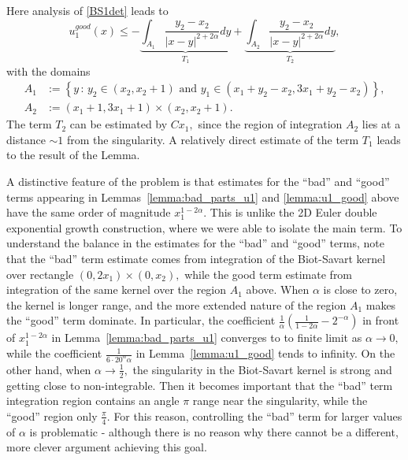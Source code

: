 \documentclass[reqno,centertags, 11pt]{amsart}
\begin{document}
Here analysis of \eqref{BS1det} leads to
\[
u_1^{good}(x) \leq -\underbrace{\int_{A_1}\frac{y_2-x_2}{|x-y|^{2+2\alpha}}  dy}_{T_1}
+ \underbrace{ \int_{A_2}\frac{y_2-x_2}{|x-y|^{2+2\alpha}}  dy}_{T_2},
\]
with the domains
\begin{equation*}
\begin{split}
A_1 &:= \left\{ y \,:\, y_2 \in \left(x_2, x_2 + 1 \right) \text{ and } y_1\in \left(x_1+y_2-x_2, 3x_1+y_2-x_2 \right) \right\},\\
A_2 &:=  \left(x_1+1, 3x_1+1\right) \times \left(x_2, x_2 + 1 \right).
\end{split}
\end{equation*}
The term $T_2$ can be estimated by $Cx_1,$ since the region of integration $A_2$ lies at a distance $\sim 1$ from the singularity.
A relatively direct estimate of the term $T_1$ leads to the result of the Lemma.

A distinctive feature of the problem is that estimates for the ``bad'' and ``good'' terms appearing in Lemmas~\ref{lemma:bad_parts_u1} and \ref{lemma:u1_good}
above have the same order of magnitude $x_1^{1-2\alpha}.$ This is unlike the 2D Euler double exponential growth construction, where we were able to isolate the main term.
To understand the balance in the estimates for the ``bad'' and ``good'' terms, note that the ``bad'' term estimate comes from integration
of the Biot-Savart kernel over rectangle $(0,2x_1) \times (0,x_2),$ while the good term estimate from integration of the same kernel over the region
$A_1$ above. When $\alpha$ is close to zero, the kernel is longer range, and the more extended nature of the region $A_1$ makes the ``good'' term dominate.
In particular, the coefficient  $\frac{1}{\alpha}\left(\frac{1}{1-2\alpha}-2^{-\alpha}\right)$ in front of $x_1^{1-2\alpha}$ in Lemma~\ref{lemma:bad_parts_u1} converges to
to finite limit as $\alpha \rightarrow 0,$ while the coefficient $\frac{1}{6\cdot 20^\alpha \alpha}$ in Lemma~\ref{lemma:u1_good} tends to infinity. On the other hand,
when $\alpha \rightarrow \frac12,$
the singularity in the Biot-Savart kernel is strong and getting close to non-integrable. Then it becomes important that the ``bad'' term integration region
contains an angle $\pi$ range near the singularity, while the ``good'' region only $\frac{\pi}{4}.$ For this reason, controlling the ``bad'' term for larger values of $\alpha$ is problematic - although there is no reason why there cannot be a different, more clever argument achieving this goal.
\end{document}
